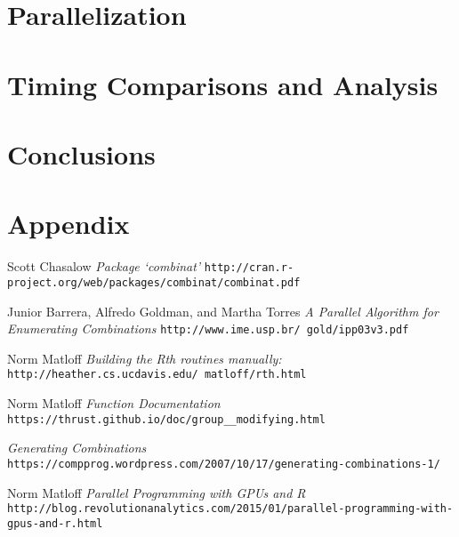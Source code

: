 \documentclass[12pt]{article}
\begin{document}
{\section{Parallelization}







\section{Timing Comparisons and Analysis}



\section{Conclusions}




\newpage

\appendix

\section{Appendix}



\newpage


\begin{thebibliography}{9}
Scott Chasalow
\textit{Package `combinat'}
\texttt{http://cran.r-project.org/web/packages/combinat/combinat.pdf}

Junior Barrera, Alfredo Goldman, and Martha Torres
\textit{A Parallel Algorithm for Enumerating Combinations}
\texttt{http://www.ime.usp.br/~gold/ipp03v3.pdf}
 
Norm Matloff
\textit{Building the Rth routines manually:}
\texttt{http://heather.cs.ucdavis.edu/~matloff/rth.html}

Norm Matloff
\textit{Function Documentation}
\texttt{https://thrust.github.io/doc/group\_\_modifying.html}

\textit{Generating Combinations}
\texttt{https://compprog.wordpress.com/2007/10/17/generating-combinations-1/}

Norm Matloff
\textit{Parallel Programming with GPUs and R}
\texttt{http://blog.revolutionanalytics.com/2015/01/parallel-programming-with-gpus-and-r.html}

\end{thebibliography}


}
\end{document}
